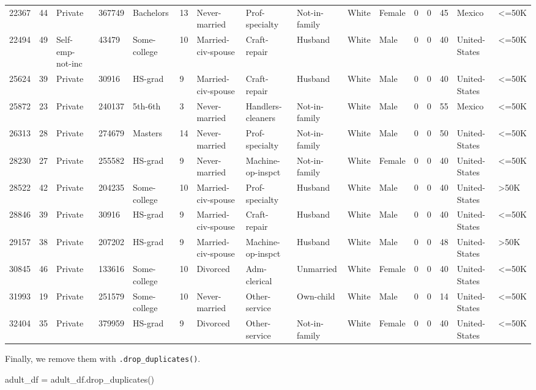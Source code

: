 \documentclass[
  letterpaper,
  DIV=11,
  numbers=noendperiod]{scrartcl}
\newenvironment{Shaded}{\begin{snugshade}}{\end{snugshade}}
\newcommand{\NormalTok}[1]{\textcolor[rgb]{0.00,0.23,0.31}{#1}}
\newcommand{\OperatorTok}[1]{\textcolor[rgb]{0.37,0.37,0.37}{#1}}
\begin{document}
\begin{longtable}[]{@{}llllllllllllllll@{}}
22367 & 44 & Private & 367749 & Bachelors & 13 & Never-married &
Prof-specialty & Not-in-family & White & Female & 0 & 0 & 45 & Mexico &
\textless=50K \\
22494 & 49 & Self-emp-not-inc & 43479 & Some-college & 10 &
Married-civ-spouse & Craft-repair & Husband & White & Male & 0 & 0 & 40
& United-States & \textless=50K \\
25624 & 39 & Private & 30916 & HS-grad & 9 & Married-civ-spouse &
Craft-repair & Husband & White & Male & 0 & 0 & 40 & United-States &
\textless=50K \\
25872 & 23 & Private & 240137 & 5th-6th & 3 & Never-married &
Handlers-cleaners & Not-in-family & White & Male & 0 & 0 & 55 & Mexico &
\textless=50K \\
26313 & 28 & Private & 274679 & Masters & 14 & Never-married &
Prof-specialty & Not-in-family & White & Male & 0 & 0 & 50 &
United-States & \textless=50K \\
28230 & 27 & Private & 255582 & HS-grad & 9 & Never-married &
Machine-op-inspct & Not-in-family & White & Female & 0 & 0 & 40 &
United-States & \textless=50K \\
28522 & 42 & Private & 204235 & Some-college & 10 & Married-civ-spouse &
Prof-specialty & Husband & White & Male & 0 & 0 & 40 & United-States &
\textgreater50K \\
28846 & 39 & Private & 30916 & HS-grad & 9 & Married-civ-spouse &
Craft-repair & Husband & White & Male & 0 & 0 & 40 & United-States &
\textless=50K \\
29157 & 38 & Private & 207202 & HS-grad & 9 & Married-civ-spouse &
Machine-op-inspct & Husband & White & Male & 0 & 0 & 48 & United-States
& \textgreater50K \\
30845 & 46 & Private & 133616 & Some-college & 10 & Divorced &
Adm-clerical & Unmarried & White & Female & 0 & 0 & 40 & United-States &
\textless=50K \\
31993 & 19 & Private & 251579 & Some-college & 10 & Never-married &
Other-service & Own-child & White & Male & 0 & 0 & 14 & United-States &
\textless=50K \\
32404 & 35 & Private & 379959 & HS-grad & 9 & Divorced & Other-service &
Not-in-family & White & Female & 0 & 0 & 40 & United-States &
\textless=50K \\
\end{longtable}

Finally, we remove them with \texttt{.drop\_duplicates()}.

\begin{Shaded}
\begin{Highlighting}[]
\NormalTok{adult\_df }\OperatorTok{=}\NormalTok{ adult\_df.drop\_duplicates()}
\end{Highlighting}
\end{Shaded}
\end{document}
